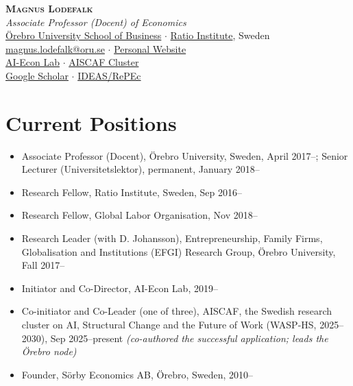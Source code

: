 \documentclass[11pt,a4paper]{article}
\newcommand{\cventry}[1]{\item #1}
\begin{document}
\begin{center}
 {\LARGE\bfseries\scshape Magnus Lodefalk}\\[6pt]
 \textit{Associate Professor (Docent) of Economics}\\[4pt]
 \href{https://www.oru.se/english/employee/magnus_lodefalk}{Örebro University School of Business} $\cdot$ \href{https://www.ratio.se/medarbetare/magnus-lodefalk/}{Ratio Institute}, Sweden\\[4pt]
 \href{mailto:magnus.lodefalk@oru.se}{magnus.lodefalk@oru.se} $\cdot$
 \href{https://sites.google.com/view/magnuslodefalk}{Personal Website}\\[4pt]
 \href{https://www.ai-econlab.com}{AI-Econ Lab} $\cdot$
 \href{https://www.aiscaf.se}{AISCAF Cluster}\\[4pt]
 \href{https://scholar.google.com/citations?user=z0WQ2JcAAAAJ}{Google Scholar} $\cdot$
 \href{https://ideas.repec.org/f/plo250.html}{IDEAS/RePEc}
\end{center}

\vspace{6pt}

\section{Current Positions}

\begin{itemize}
 \cventry{Associate Professor (Docent), Örebro University, Sweden, April 2017--; Senior Lecturer (Universitetslektor), permanent, January 2018--}
 \cventry{Research Fellow, Ratio Institute, Sweden, Sep 2016--}
 \cventry{Research Fellow, Global Labor Organisation, Nov 2018--}
 \cventry{Research Leader (with D. Johansson), Entrepreneurship, Family Firms, Globalisation and Institutions (EFGI) Research Group, Örebro University, Fall 2017--}
 \cventry{Initiator and Co-Director, AI-Econ Lab, 2019--}
 
\cventry{Co-initiator and Co-Leader (one of three), AISCAF, the Swedish research cluster on AI, Structural Change and the Future of Work (WASP-HS, 2025--2030), Sep 2025--present \textit{(co-authored the successful application; leads the Örebro node)}}
\cventry{Founder, Sörby Economics AB, Örebro, Sweden, 2010--}
\end{itemize}

\end{document}
